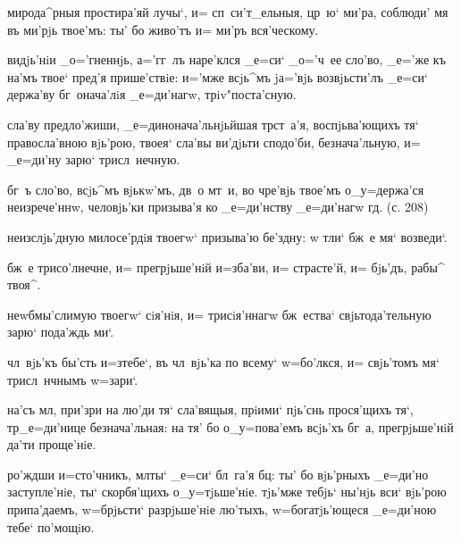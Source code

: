 мирода^рныя простира'яй лучы`, и= сп~си'т_ельныя, цр~ю` 
ми'ра, соблюди' мя въ ми'рjь твое'мъ: ты' бо живо'тъ и= 
ми'ръ вся'ческому.

видjь'нiи _о='гненнjь, а='гг~лъ наре'клся _е=си` _о='ч~ее 
сло'во, _е='же къ на'мъ твое` пред'я прише'ствiе: 
и='мже всjь^мъ jа='вjь возвjьсти'лъ _е=си` держа'ву 
бг~онача'лiя _е=ди'нагw, трiv"поста'сную.

сла'ву предло'жиши, _е=динонача'льнjьйшая тр ст~а'я, 
воспjьва'ющихъ тя` правосла'вною вjь'рою, твоея` сла'вы 
ви'дjьти сподо'би, безнача'льную, и= _е=ди'ну зарю` 
трисл~нечную.

бг~ъ сло'во, всjь^мъ вjькw'мъ, дв~о мт~и, во чре'вjь 
твое'мъ о_у=держа'ся неизрече'ннw, человjь'ки призыва'я 
ко _е=ди'нству _е=ди'нагw гд. (с. 208)


неизслjь'дную милосе'рдiя твоегw` призыва'ю бе'здну: w\т 
тли` бж~е мя` возведи`.

бж~е трисо'лнечне, и= прегрjьше'нiй и=зба'ви, и= 
страсте'й, и= бjь'дъ, рабы^ твоя^. %

неwбмы'слимую твоегw` сiя'нiя, и= трисiя'ннагw бж~ества` 
свjьтода'тельную зарю` пода'ждь ми`.

чл~вjь'къ бы'сть и=з\ъ тебе`, въ чл~вjь'ка по всему` 
w=бо'лкся, и= свjь'томъ мя` трисл~нчнымъ w=зари`.


на'съ мл, при'зри на лю'ди тя` сла'вящыя, прiими` 
пjь'снь прося'щихъ тя`, тр _е=ди'нице безнача'льная: 
на тя' бо о_у=пова'емъ всjь'хъ бг~а, прегрjьше'нiй да'ти 
проще'нiе.

ро'ждши и=сто'чникъ, мл ты` _е=си` бл~га'я бц: 
ты' бо вjь'рныхъ _е=ди'но заступле'нiе, ты` скорбя'щихъ 
о_у=тjьше'нiе. тjь'мже тебjь` ны'нjь вси` вjь'рою 
припа'даемъ, w=брjьсти` разрjьше'нiе лю'тыхъ, 
w=богатjь'ющеся _е=ди'ною тебе` по'мощiю.


